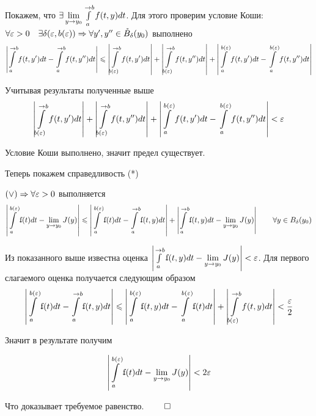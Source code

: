 Покажем, что $\exists \lim\limits_{y \rightarrow y_0}\int\limits_a^{\rightarrow b} f(t, y) dt$. Для этого проверим условие Коши: $\forall \varepsilon > 0 \quad \exists \delta(\varepsilon, b(\varepsilon)) \Rightarrow \forall y', y'' \in \mathring{B}_\delta(y_0)$ выполнено
$$\left| \int\limits_a^{\rightarrow b}f(t, y') dt - \int\limits_a^{\rightarrow b} f(t, y'')dt \right| \leqslant \left| \int\limits_{b(\varepsilon)}^{\rightarrow b} f(t, y')dt \right| + \left| \int\limits_{b(\varepsilon)}^{\rightarrow b} f(t, y'')dt \right| + \left| \int\limits_a^{b(\varepsilon)}f(t, y') dt - \int\limits_a^{b(\varepsilon)} f(t, y'')dt \right|$$

Учитывая результаты полученные выше
$$\left| \int\limits_{b(\varepsilon)}^{\rightarrow b} f(t, y')dt \right| + \left| \int\limits_{b(\varepsilon)}^{\rightarrow b} f(t, y'')dt \right| + \left| \int\limits_a^{b(\varepsilon)}f(t, y') dt - \int\limits_a^{b(\varepsilon)} f(t, y'')dt \right| < \varepsilon$$

Условие Коши выполнено, значит предел существует.

Теперь покажем справедливость (*)

$(\vee) \Rightarrow \forall \varepsilon > 0$ выполняется
$$\left| \int\limits^{b(\varepsilon)}_a \ff(t) dt - \lim\limits_{y \ra y_0} J(y) \right| \leq \left| \int\limits^{b(\varepsilon)}_a \ff(t) dt - \int\limits^{\ra b}_a \ff(t, y) dt \right| + \left| \int\limits^{\ra b}_a \ff(t, y) dt - \lim\limits_{y \ra y_0} J(y) \right| \qquad \forall y \in B_\delta(y_0)$$

Из показанного выше известна оценка $\left| \int\limits^{\ra b}_a \ff(t, y) dt - \lim\limits_{y \ra y_0} J(y) \right| < \varepsilon$. Для первого слагаемого оценка получается следующим образом
$$\left| \int\limits^{b(\varepsilon)}_a \ff(t) dt - \int\limits^{\ra b}_a \ff(t, y) dt \right| \leq \left| \int\limits_a^{b(\varepsilon)}\ff(t, y) dt - \int\limits_a^{b(\varepsilon)}\ff(t) dt\right| + \left| \int\limits_{b(\varepsilon)}^{\ra b} f(t, y) dt \right| < \frac{\varepsilon}{2}$$

Значит в результате получим

$$\left| \int\limits^{b(\varepsilon)}_a \ff(t) dt - \lim\limits_{y \ra y_0} J(y) \right| < 2 \varepsilon$$

Что доказывает требуемое равенство. $\qed$


